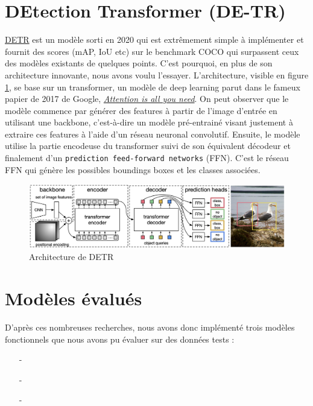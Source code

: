 \section{DEtection Transformer (DE-TR)}

\href{https://github.com/facebookresearch/detr}{DETR} est un modèle sorti en 2020 qui est extrêmement simple à implémenter et fournit des scores (mAP, IoU etc) sur le benchmark COCO qui surpassent ceux des modèles existants de quelques points. C’est pourquoi, en plus de son architecture innovante, nous avons voulu l’essayer. L’architecture, visible en figure \ref{fig:detr_architecture}, se base sur un transformer, un modèle de deep learning parut dans le fameux papier de 2017 de Google, \href{https://arxiv.org/pdf/1706.03762.pdf}{\textit{Attention is all you need}}. On peut observer que le modèle commence par générer des features à partir de l'image d'entrée en utilisant une backbone, c'est-à-dire un modèle pré-entrainé visant justement à extraire ces features à l'aide d'un réseau neuronal convolutif. Ensuite, le modèle utilise la partie encodeuse du transformer suivi de son équivalent décodeur et finalement d'un \verb|prediction feed-forward networks| (FFN). C'est le réseau FFN qui génère les possibles boundings boxes et les classes associées.

\begin{figure}[th!]
    \centering
    \includegraphics[width=\textwidth]{images/detr_architecture.png}
    \caption{Architecture de DETR}
    \label{fig:detr_architecture}
\end{figure}

\section{Modèles évalués}
D'après ces nombreuses recherches, nous avons donc implémenté trois modèles fonctionnels que nous avons pu évaluer sur des données tests : 

\begin{itemize}
    \item[-] 
    \item[-] 
    \item[-] 
\end{itemize}